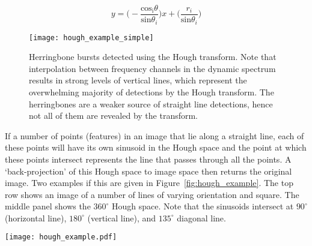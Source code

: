 \begin{equation}
y = \bigg(- \frac{\mathrm{cos_i}\theta}{\mathrm{sin}\theta_i}\bigg)x + \bigg(\frac{r_i}{\mathrm{sin}\theta_i}\bigg)
\end{equation}
\begin{figure}[t!]
\begin{center}
\texttt{[image: hough\_example\_simple]}
\caption[Hough transform herringbones]{Herringbone bursts detected using the Hough transform. Note that interpolation between frequency channels in the dynamic spectrum results in strong levels of vertical lines, which represent the overwhelming majority of detections by the Hough transform. The herringbones are a weaker source of straight line detections, hence not all of them are revealed by the transform.}
\label{fig:hough0}
\end{center}
\end{figure}
If a number of points (features) in an image that lie along a straight line, each of these points will have its own sinusoid in the Hough space and the point at which these points intersect represents the line that passes through all the points. A `back-projection' of this Hough space to image space then returns the original image. Two examples if this are given in Figure~\ref{fig:hough_example}. The top row shows an image of a number of lines of varying orientation and square. The middle panel shows the $360^{\circ}$ Hough space. Note that the sinusoids intersect at $90^{\circ}$ (horizontal line), $180^{\circ}$ (vertical line), and $135^{\circ}$ diagonal line. 
\begin{sidewaysfigure}
\centering
\texttt{[image: hough\_example.pdf]}
\caption[Example Hough Transform]{(a) An image with a number of lines of varying orientation and intensity. (b) The Hough transform of the image in $(r, \theta)$ space. The multiple intersection points at $90^{\circ}$ and a variety of radii correspond to the multiple horizontal lines in the original image. There are also intersection points at $135^{\circ}$ (diagonal line in original image) and $180^{\circ}$ (vertical) line. (c) The back projected Hough transform, recovering all features in the original image. The bottom row (d)-(f) show the same as the top row, expect that the back-projection is chosen over a region in hough space that only contains the vertical line. In this way only the vertical line is recovered and the remaining features are not recovered.}
\label{fig:hough_example}
\end{sidewaysfigure}
